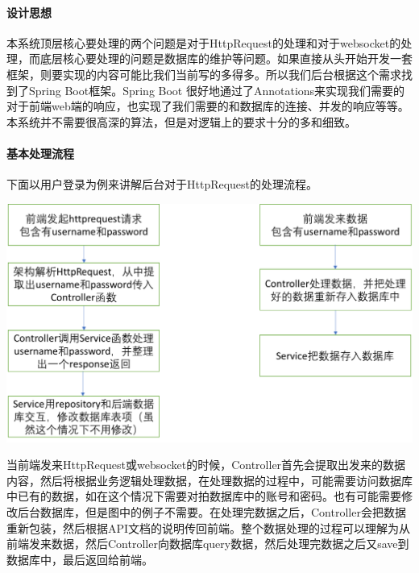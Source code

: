 \documentclass{article}
\begin{document}
                \paragraph{设计思想}
                    本系统顶层核心要处理的两个问题是对于HttpRequest的处理和对于websocket的处理，而底层核心要处理的问题是数据库的维护等问题。如果直接从头开始开发一套框架，则要实现的内容可能比我们当前写的多得多。所以我们后台根据这个需求找到了Spring Boot框架。Spring Boot 很好地通过了Annotations来实现我们需要的对于前端web端的响应，也实现了我们需要的和数据库的连接、并发的响应等等。本系统并不需要很高深的算法，但是对逻辑上的要求十分的多和细致。
                \paragraph{基本处理流程}
                    下面以用户登录为例来讲解后台对于HttpRequest的处理流程。

                    \includegraphics[scale = .3]{fig/基本数据.png}

                    当前端发来HttpRequest或websocket的时候，Controller首先会提取出发来的数据内容，然后将根据业务逻辑处理数据，在处理数据的过程中，可能需要访问数据库中已有的数据，如在这个情况下需要对拍数据库中的账号和密码。也有可能需要修改后台数据库，但是图中的例子不需要。在处理完数据之后，Controller会把数据重新包装，然后根据API文档的说明传回前端。整个数据处理的过程可以理解为从前端发来数据，然后Controller向数据库query数据，然后处理完数据之后又save到数据库中，最后返回给前端。
\end{document}
